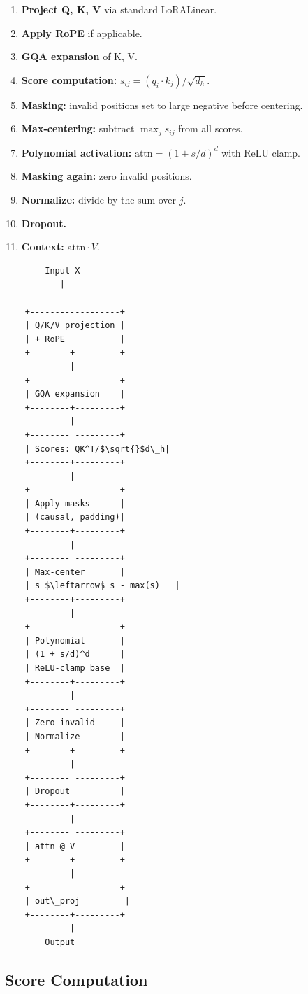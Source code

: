\begin{enumerate}
\item \textbf{Project Q, K, V} via standard LoRALinear.
\item \textbf{Apply RoPE} if applicable.
\item \textbf{GQA expansion} of K, V.
\item \textbf{Score computation:} $s_{ij} = (q_i \cdot k_j)/\sqrt{d_h}$.
\item \textbf{Masking:} invalid positions set to large negative before centering.
\item \textbf{Max-centering:} subtract $\max_j s_{ij}$ from all scores.
\item \textbf{Polynomial activation:} $\text{attn} = (1 + s/d)^d$ with ReLU clamp.
\item \textbf{Masking again:} zero invalid positions.
\item \textbf{Normalize:} divide by the sum over $j$.
\item \textbf{Dropout.}
\item \textbf{Context:} $\text{attn} \cdot V$.

\end{enumerate}
\begin{lstlisting}
        Input X
           |
            
    +------------------+
    | Q/K/V projection |
    | + RoPE           |
    +--------+---------+
             |
    +-------- ---------+
    | GQA expansion    |
    +--------+---------+
             |
    +-------- ---------+
    | Scores: QK^T/$\sqrt{}$d\_h|
    +--------+---------+
             |
    +-------- ---------+
    | Apply masks      |
    | (causal, padding)|
    +--------+---------+
             |
    +-------- ---------+
    | Max-center       |
    | s $\leftarrow$ s - max(s)   |
    +--------+---------+
             |
    +-------- ---------+
    | Polynomial       |
    | (1 + s/d)^d      |
    | ReLU-clamp base  |
    +--------+---------+
             |
    +-------- ---------+
    | Zero-invalid     |
    | Normalize        |
    +--------+---------+
             |
    +-------- ---------+
    | Dropout          |
    +--------+---------+
             |
    +-------- ---------+
    | attn @ V         |
    +--------+---------+
             |
    +-------- ---------+
    | out\_proj         |
    +--------+---------+
             |
        Output
\end{lstlisting}

\subsection{Score Computation}

